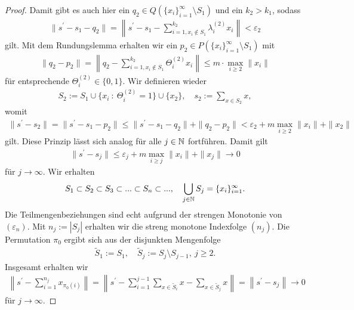 \begin{proof}
	Damit gibt es auch hier ein $ q_2 \in Q(\{x_i\}_{i = 1}^\infty \setminus S_1) $ und ein $ k_2 > k_1 $, sodass
	\begin{align*}
	\|s^\prime - s_1 - q_2 \| 
	= 
	\left\| s^\prime - s_1 - \sum \limits_{i = 1, x_i \notin S_1 }^{k_2} \lambda_i^{(2)} x_i \right\| < \varepsilon_2
	\end{align*}
	gilt. Mit dem Rundungslemma erhalten wir ein $ p_2 \in P(\{x_i\}_{i = 1}^\infty \setminus S_1) $ mit
	\begin{align*}
	\| q_2 - p_2 \| 
	=
	\left\| q_2 - \sum \limits_{i=1,x_i \notin S_1}^{k_2} \Theta_i^{(2)} x_i \right\|
	\leq
	m \cdot \max \limits_{i\geq 2} \| x_i \| 
	\end{align*}
	für entsprechende $ \Theta_i^{(2)} \in \{0,1\} $. Wir definieren wieder
	\begin{align*}
	S_2 := S_1 \cup \{x_i \ : \ \Theta_i^{(2)} = 1\} \cup \{x_2\}, \quad 
	s_2 := \sum \limits_{x \in S_2} x,
	\end{align*}
	womit
	\begin{align*}
	\|s^\prime - s_2 \| 
	=
	\| s^\prime - s_1 -p_2 \|
	\leq
	\| s^\prime - s_1 -q_2 \| + \| q_2 - p_2\|
	< 
	\varepsilon_2 + m \max_{i \geq 2} \| x_i \| + \| x_2\|
	\end{align*}
	gilt. Diese Prinzip lässt sich analog für alle $ j \in \mathbb{N} $ fortführen.
	Damit gilt
	\begin{align*}
	\|s^\prime - s_j \| \leq \varepsilon_j + m \max_{i \geq j} \| x_i \| + \|x_j\| \rightarrow 0
	\end{align*}
	für $ j \to \infty $. Wir erhalten 
	\begin{align*}
	S_1 \subset S_2 \subset S_3 \subset ... \subset S_n \subset ..., \quad
	\bigcup \limits_{j \in \mathbb{N}} S_j = \{x_i\}_{i=1}^\infty.
	\end{align*}
	Die Teilmengenbeziehungen sind echt aufgrund der strengen Monotonie von $ (\varepsilon_n) $. 
	Mit $ n_j := | S_j | $ erhalten wir die streng monotone Indexfolge $ (n_j) $. Die Permutation $ \pi_0  $ ergibt sich aus der disjunkten Mengenfolge
	\begin{align*}
	\tilde{S}_1 := S_1, \quad 
	\tilde{S}_j := S_j \setminus S_{j-1} , \ j \geq 2.
	\end{align*}
	Insgesamt erhalten wir
	\begin{align*}
		\left\| s^\prime - \sum \limits_{i =1}^{n_j} x_{\pi_0(i)} \right\|
		= 
		\left\|
		s^\prime - \sum \limits_{i=1}^{j -1 } \sum \limits_{x \in \tilde{S}_i} x - \sum \limits_{x \in \tilde{S}_j} x
		\right\|
		= 
		\left\|
		s^\prime - s_j \right\|
		\rightarrow 0
	\end{align*}
	für $ j \to \infty $.
\end{proof}


